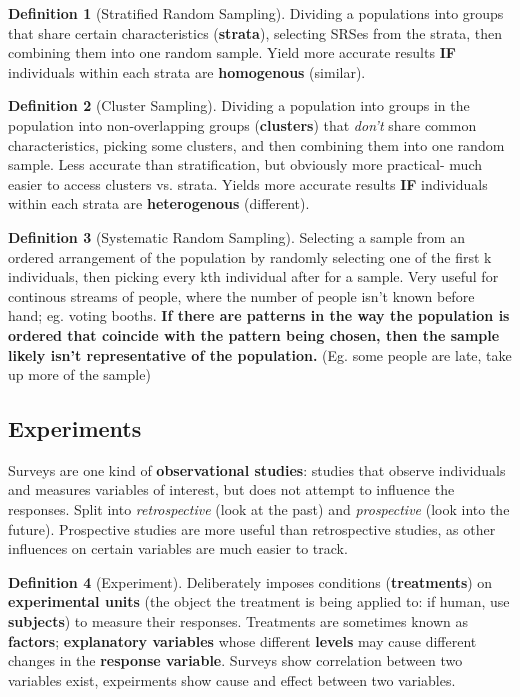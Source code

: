 \documentclass[12pt, a4paper]{article}
\theoremstyle{definition}
\newtheorem{definition}{Definition}
\begin{document}
\begin{definition}[Stratified Random Sampling]
    Dividing a populations into groups that share certain characteristics (\textbf{strata}), selecting SRSes from the strata, then combining them into one random sample.
    Yield more accurate results \textbf{IF} individuals within each strata are \textbf{homogenous} (similar).
\end{definition}

\begin{definition}[Cluster Sampling]
    Dividing a population into groups in the population into non-overlapping groups (\textbf{clusters}) that \textit{don't} share common characteristics, picking some clusters, and then combining them into one random sample.
    Less accurate than stratification, but obviously more practical- much easier to access clusters vs. strata.
    Yields more accurate results \textbf{IF} individuals within each strata are \textbf{heterogenous} (different).
\end{definition}

\begin{definition}[Systematic Random Sampling]
    Selecting a sample from an ordered arrangement of the population by randomly selecting one of the first k individuals, then picking every kth individual after for a sample.
    Very useful for continous streams of people, where the number of people isn't known before hand; eg. voting booths.
    \textbf{If there are patterns in the way the population is ordered that coincide with the pattern being chosen, then the sample likely isn't representative of the population.}
    (Eg. some people are late, take up more of the sample)
\end{definition}

\subsection{Experiments}
Surveys are one kind of \textbf{observational studies}: studies that observe individuals and measures variables of interest, but does not attempt to influence the responses.
Split into \textit{retrospective} (look at the past) and \textit{prospective} (look into the future).
Prospective studies are more useful than retrospective studies, as other influences on certain variables are much easier to track.

\begin{definition}[Experiment]
    Deliberately imposes conditions (\textbf{treatments}) on \textbf{experimental units} (the object the treatment is being applied to: if human, use \textbf{subjects}) to measure their responses.
    Treatments are sometimes known as \textbf{factors}; \textbf{explanatory variables} whose different \textbf{levels} may cause different changes in the \textbf{response variable}.
    Surveys show correlation between two variables exist, expeirments show cause and effect between two variables.
\end{definition}
\end{document}
